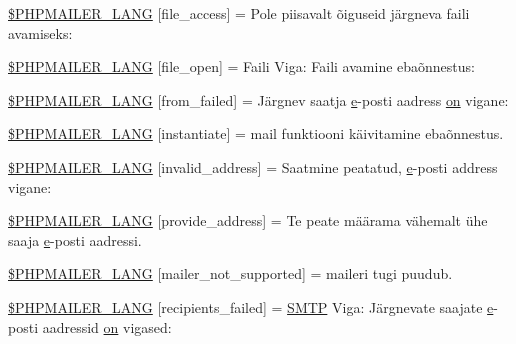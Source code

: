 \begin{DoxyCompactItemize}
\item 
\hyperlink{phpmailer_8lang-et_8php_a7e83349023b856ef9e5c46e30ae6d51e}{\$\+P\+H\+P\+M\+A\+I\+L\+E\+R\+\_\+\+L\+A\+NG} \mbox{[}\textquotesingle{}file\+\_\+access\textquotesingle{}\mbox{]} = \textquotesingle{}Pole piisavalt õiguseid järgneva faili avamiseks\+: \textquotesingle{}
\item 
\hyperlink{phpmailer_8lang-et_8php_a28d1a6517bf4c942a0ddd506188ad2e0}{\$\+P\+H\+P\+M\+A\+I\+L\+E\+R\+\_\+\+L\+A\+NG} \mbox{[}\textquotesingle{}file\+\_\+open\textquotesingle{}\mbox{]} = \textquotesingle{}Faili Viga\+: Faili avamine ebaõnnestus\+: \textquotesingle{}
\item 
\hyperlink{phpmailer_8lang-et_8php_adf832ae12155a09be077c6d5e4fd7e22}{\$\+P\+H\+P\+M\+A\+I\+L\+E\+R\+\_\+\+L\+A\+NG} \mbox{[}\textquotesingle{}from\+\_\+failed\textquotesingle{}\mbox{]} = \textquotesingle{}Järgnev saatja \hyperlink{jquery-ui_8min_8js_abea95a4e94bc6f4151d5683d4c12c3f4}{e}-\/posti aadress \hyperlink{fullpage_2plugin_8min_8js_a0258429d15d28b8440a6c44b3a15f390}{on} vigane\+: \textquotesingle{}
\item 
\hyperlink{phpmailer_8lang-et_8php_ad58dde16780f4770ccf4dd282ea1f5ad}{\$\+P\+H\+P\+M\+A\+I\+L\+E\+R\+\_\+\+L\+A\+NG} \mbox{[}\textquotesingle{}instantiate\textquotesingle{}\mbox{]} = \textquotesingle{}mail funktiooni käivitamine ebaõnnestus.\textquotesingle{}
\item 
\hyperlink{phpmailer_8lang-et_8php_a42d61bcea4c79599ecb44fd062f54d47}{\$\+P\+H\+P\+M\+A\+I\+L\+E\+R\+\_\+\+L\+A\+NG} \mbox{[}\textquotesingle{}invalid\+\_\+address\textquotesingle{}\mbox{]} = \textquotesingle{}Saatmine peatatud, \hyperlink{jquery-ui_8min_8js_abea95a4e94bc6f4151d5683d4c12c3f4}{e}-\/posti address vigane\+: \textquotesingle{}
\item 
\hyperlink{phpmailer_8lang-et_8php_a8b97897c2406b7392b056f375feeefbb}{\$\+P\+H\+P\+M\+A\+I\+L\+E\+R\+\_\+\+L\+A\+NG} \mbox{[}\textquotesingle{}provide\+\_\+address\textquotesingle{}\mbox{]} = \textquotesingle{}Te peate määrama vähemalt ühe saaja \hyperlink{jquery-ui_8min_8js_abea95a4e94bc6f4151d5683d4c12c3f4}{e}-\/posti aadressi.\textquotesingle{}
\item 
\hyperlink{phpmailer_8lang-et_8php_aa2ebcb8833ee83a7ad67401c4bb3a6ad}{\$\+P\+H\+P\+M\+A\+I\+L\+E\+R\+\_\+\+L\+A\+NG} \mbox{[}\textquotesingle{}mailer\+\_\+not\+\_\+supported\textquotesingle{}\mbox{]} = \textquotesingle{} maileri tugi puudub.\textquotesingle{}
\item 
\hyperlink{phpmailer_8lang-et_8php_a7589d30bb9b368327c2df015f3e6bcba}{\$\+P\+H\+P\+M\+A\+I\+L\+E\+R\+\_\+\+L\+A\+NG} \mbox{[}\textquotesingle{}recipients\+\_\+failed\textquotesingle{}\mbox{]} = \textquotesingle{}\hyperlink{class_s_m_t_p}{S\+M\+TP} Viga\+: Järgnevate saajate \hyperlink{jquery-ui_8min_8js_abea95a4e94bc6f4151d5683d4c12c3f4}{e}-\/posti aadressid \hyperlink{fullpage_2plugin_8min_8js_a0258429d15d28b8440a6c44b3a15f390}{on} vigased\+: \textquotesingle{}

\end{DoxyCompactItemize}
